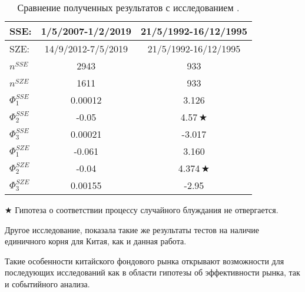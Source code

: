 \documentclass[a4paper,12pt]{article}
\begin{document}
\begin{table}
\centering
\caption{Сравнение полученных результатов с исследованием \cite{Liu1997}.}
\label{tab:comp}
\begin{tabular}{|l|c|c|}
  \hline
  SSE: &1/5/2007-1/2/2019 & 21/5/1992-16/12/1995 \\ \hline
	SZE: &14/9/2012-7/5/2019 & 21/5/1992-16/12/1995\\ \hline
	$n^{SSE}$ & 2943 & 933\\ \hline
	$n^{SZE}$ & 1611 & 933\\ \hline
	$\Phi_1^{SSE}$ & 0.00012 & 3.126\\ \hline
	$\Phi_2^{SSE}$ & -0.05 & 4.57$\,\bigstar$\\ \hline
	$\Phi_3^{SSE}$ & 0.00021 & -3.017\\ \hline
	$\Phi_1^{SZE}$ & -0.061 & 3.160\\ \hline
	$\Phi_2^{SZE}$ & -0.04 & 4.374$\,\bigstar$\\ \hline
	$\Phi_3^{SZE}$ & 0.00155 & -2.95\\ \hline
\end{tabular}

{\raggedright \par $\bigstar$ Гипотеза о соответствии процессу случайного блуждания не отвергается.}
\end{table}

Другое исследование, \cite{Wang2015} показала такие же результаты тестов на наличие единичного корня для Китая, как и данная работа.

Такие особенности китайского фондового рынка открывают возможности для последующих исследований как в области гипотезы об эффективности рынка, так и событийного анализа.
\newpage


\thispagestyle{empty}
\end{document}
